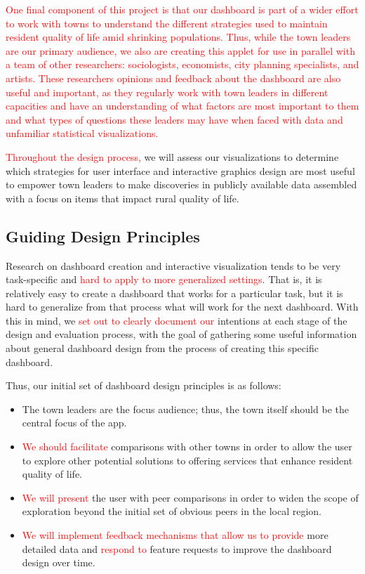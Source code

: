 \documentclass[letterpaper,inpress]{jdsart}
\begin{document}
{\textcolor{red}{One final component of this project is that our dashboard is part of a wider effort to work with towns to understand the different strategies used to maintain resident quality of life amid shrinking populations. Thus, while the town leaders are our primary audience, we also are creating this applet for use in parallel with a team of other researchers: sociologists, economists, city planning specialists, and artists. These researchers opinions and feedback about the dashboard are also useful and important, as they regularly work with town leaders in different capacities and have an understanding of what factors are most important to them and what types of questions these leaders may have when faced with data and unfamiliar statistical visualizations.}}

{\textcolor{red}{Throughout the design process,}} we will assess our visualizations to determine which strategies for user interface and interactive graphics design are most useful to empower town leaders to make discoveries in publicly available data assembled with a focus on items that impact rural quality of life.

\hypertarget{guiding-design-principles}{%
\subsection{Guiding Design Principles}\label{guiding-design-principles}}

Research on dashboard creation and interactive visualization tends to be very task-specific and {\textcolor{red}{hard to apply to more generalized settings}}. That is, it is relatively easy to create a dashboard that works for a particular task, but it is hard to generalize from that process what will work for the next dashboard. With this in mind, we {\textcolor{red}{set out to clearly document our}} intentions at each stage of the design and evaluation process, with the goal of gathering some useful information about general dashboard design from the process of creating this specific dashboard.

Thus, our initial set of dashboard design principles is as follows:

\begin{itemize}
\item The town leaders are the focus audience; thus, the town itself should be the central focus of the app.
\item {\textcolor{red}{We should facilitate}} comparisons with other towns in order to allow the user to explore other potential solutions to offering services that enhance resident quality of life.
\item {\textcolor{red}{We will present}} the user with peer comparisons in order to widen the scope of exploration beyond the initial set of obvious peers in the local region.
\item {\textcolor{red}{We will implement feedback mechanisms that allow us to provide}} more detailed data and {\textcolor{red}{respond to}} feature requests to improve the dashboard design over time.
\end{itemize}
\end{document}
